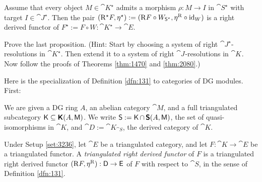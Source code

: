 \begin{prop} \label{prop:1355}
Assume that every object $M \in \cat{K}^{\star}$ admits a morphism 
$\rho : M \to I$ in $\cat{S}^{\star}$ with target $I \in \cat{J}^{\star}$. 
Then the pair 
$(\mathrm{R}^{\star} F, \eta^{\star}) := 
(\mathrm{R} F \circ W_{\operatorname{\mathsf{S}}^{\star}}, \eta^{\mathrm{R}} \circ \operatorname{id}_W)$
is a right derived functor of 
$F^{\star} := F \circ W : \cat{K}^{\star} \to \cat{E}$.
\end{prop}

\begin{exer} \label{exer:1355}
Prove the last proposition.  (Hint: Start by choosing a system of right 
$\cat{J}^{\star}$-resolutions in $\cat{K}^{\star}$. Then extend it 
to a system of right $\cat{J}^{}$-resolutions in $\cat{K}^{}$. 
Now follow the proofs of Theorems \ref{thm:1470} and \ref{thm:2080}.)
\end{exer}

Here is the specialization of Definition \ref{dfn:131} to categories of DG 
modules. First:  

\begin{setup} \label{set:3236}
We are given a DG ring $A$, an abelian category
$\cat{M}$, and a full triangulated subcategory
$\operatorname{\mathsf{K}} \subseteq \boldsymbol{\mathsf{K}}(A, \operatorname{\mathsf{M}})$. We write 
$\operatorname{\mathsf{S}} := \operatorname{\mathsf{K}} \cap \, \boldsymbol{\mathsf{S}}(A, \operatorname{\mathsf{M}})$, 
the set of quasi-isomorphisms in $\cat{K}$, and 
$\cat{D} := \cat{K}_{\cat{S}}$, the derived category of $\cat{K}$. 
\end{setup}

\begin{dfn} \label{dfn:3236}
Under Setup \ref{set:3236}, let
$\cat{E}$ be a triangulated category, and let 
$F : \cat{K} \to \cat{E}$ 
be a triangulated functor.  
A {\em triangulated right derived functor} 
of $F$ is a triangulated right derived functor 
$(\mathrm{R} F, \eta^{\mathrm{R}}) : \operatorname{\mathsf{D}} \to \operatorname{\mathsf{E}}$
of $F$ with respect to $\cat{S}$, in the sense 
of Definition \ref{dfn:131}. 
\end{dfn}

